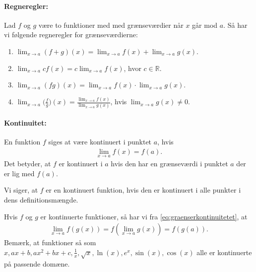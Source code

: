 \paragraph*{Regneregler:}
Lad $f$ og $g$ være to funktioner med med grænseværdier når $x$ går mod $a$. Så har vi følgende regneregler for grænseværdierne:
\begin{enumerate}
\item $\displaystyle\lim_{x \to a} (f+g)(x) = \displaystyle\lim_{x \to a} f(x) + \lim_{x \to a} g(x)$.
\item $\displaystyle\lim_{x \to a} cf(x) = c \displaystyle\lim_{x \to a} f(x)$, hvor $c \in \mathbb{R}$.
\item $\displaystyle\lim_{x \to a} (fg)(x) = \displaystyle\lim_{x \to a} f(x) \cdot \lim_{x \to a} g(x)$.
\item $\displaystyle \lim_{x \to a} \Big(\frac{f}{g}\Big)(x) = \frac{\displaystyle\lim_{x \to a} f(x)}{\displaystyle\lim_{x \to a} g(x)}$, hvis $\displaystyle\lim_{x \to a} g(x) \neq 0$.
\end{enumerate}

\paragraph*{Kontinuitet:}
En funktion $f$ siges at være kontinuert i punktet $a$, hvis
\begin{align}\label{eq:graenserkontinuitetet}
\lim_{x \to a} f(x) = f(a).
\end{align}
Det betyder, at $f$ er kontinuert i $a$ hvis den har en grænseværdi i punktet $a$ der er lig med $f(a)$.

Vi siger, at $f$ er en kontinuert funktion, hvis den er kontinuert i alle punkter i dens definitionsmængde.  

Hvis $f$ og $g$ er kontinuerte funktioner, så har vi fra \eqref{eq:graenserkontinuitetet}, at
\begin{align*}
\lim_{x \to a} f(g(x)) = f(\lim_{x \to a} g(x)) = f(g(a)).
\end{align*}
Bemærk, at funktioner så som $x,ax+b,ax^2+bx+c,\frac{1}{x},\sqrt{x},\ln(x), e^x, \sin(x),\cos(x)$ alle er kontinuerte på passende domæne.

